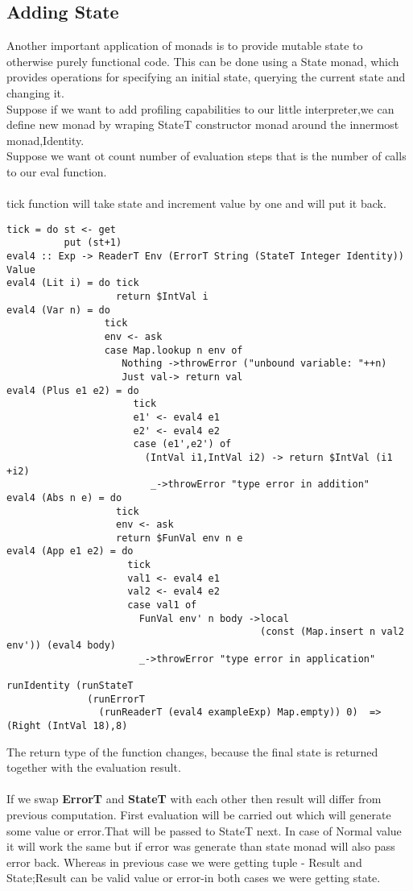 \documentclass[a4paper,10pt]{article}
\begin{document}
\subsection{Adding State}	
Another important application of monads is to provide mutable state to otherwise purely functional code. This can be done using a State monad, which provides operations for specifying an
initial state, querying the current state and changing it.
\\Suppose if we want to add profiling capabilities to our little interpreter,we can define new monad by wraping StateT constructor monad around the innermost monad,Identity.
\\Suppose we want ot count number of evaluation steps that is the number of calls to our eval function.
\\\\
tick function will take state and increment value by one and will put it back.
\begin{verbatim}
tick = do st <- get
          put (st+1)
eval4 :: Exp -> ReaderT Env (ErrorT String (StateT Integer Identity)) Value
eval4 (Lit i) = do tick
                   return $IntVal i 
eval4 (Var n) = do 
                 tick
                 env <- ask
                 case Map.lookup n env of 
                    Nothing ->throwError ("unbound variable: "++n) 
                    Just val-> return val
eval4 (Plus e1 e2) = do 
                      tick
                      e1' <- eval4 e1
                      e2' <- eval4 e2
                      case (e1',e2') of 
                        (IntVal i1,IntVal i2) -> return $IntVal (i1 +i2) 
                         _->throwError "type error in addition"
eval4 (Abs n e) = do 
                   tick
                   env <- ask 
                   return $FunVal env n e 
eval4 (App e1 e2) = do
                     tick
                     val1 <- eval4 e1
                     val2 <- eval4 e2
                     case val1 of
                       FunVal env' n body ->local 
                                            (const (Map.insert n val2 env')) (eval4 body)
                       _->throwError "type error in application" 

runIdentity (runStateT 
              (runErrorT 
                (runReaderT (eval4 exampleExp) Map.empty)) 0)  => (Right (IntVal 18),8)
\end{verbatim}
The return type of the function changes, because the final state is returned together with the evaluation result.\\
\\If we swap \textbf{ErrorT} and \textbf{StateT} with each other then result will differ from previous computation.
First evaluation will be carried out which will generate some value or error.That will be passed to StateT next.
In case of Normal value it will work the same but if error was generate than state monad will also pass error back.
Whereas in previous case we were getting tuple - Result and State;Result can be valid value or error-in both cases we were getting state.
\end{document}
